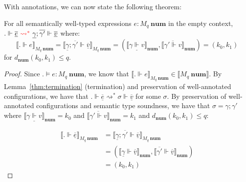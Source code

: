 With annotations, we can now state the following theorem:
\begin{theorem}\label{thm:error-soundness}
  For all semantically well-typed expressions $e : M_q \ \mathbf{num}$ in the
  empty context, $. \Vdash \underline{\overline{e}} \
  \textcolor{red}{\rightsquigarrow^*} \ \underline{\gamma}; \overline{\gamma'}
  \Vdash \underline{\overline{v}}$ where:
  $$
  \llbracket . \Vdash e \rrbracket_{M_q \ \mathbf{num}} 
  = \llbracket \underline{\gamma}; \overline{\gamma'} \Vdash
  \underline{\overline{v}} \rrbracket_{M_q \ \mathbf{num}} 
  = (\llbracket \underline{\gamma \Vdash v} \rrbracket_{\mathbf{num}},
  \llbracket \overline{\gamma' \Vdash v} \rrbracket_{\mathbf{num}}) 
  = (k_0, k_1)
  $$
  for $d_{\mathbf{num}}(k_0, k_1) \leq q$.
\end{theorem}
\begin{proof}
  Since $. \vDash e : M_q \ \mathbf{num}$, we know that $\llbracket . \Vdash e
  \rrbracket_{M_q \ \mathbf{num}} \in \llbracket M_q \ \mathbf{num}
  \rrbracket$. 
  By Lemma~\ref{thm:termination} (termination) and preservation of
  well-annotated configurations, we have that 
  $. \Vdash \underline{\overline{e}} \rightsquigarrow^{*} \sigma \Vdash
  \underline{\overline{v}}$ for some $\sigma$.
  By preservation of well-annotated configurations and semantic type soundness, we have
  that $\sigma = \gamma; \gamma'$ where $\llbracket \underline{\gamma \Vdash v}
  \rrbracket_{\mathbf{num}} = k_0$ and $\llbracket \overline{\gamma' \Vdash v}
  \rrbracket_{\mathbf{num}} = k_1$ and $d_{\mathbf{num}}(k_0, k_1) \leq q$:

  \begin{equation}
    \begin{aligned}
      \llbracket . \Vdash \underline{\overline{e}} \rrbracket_{M_q \ \mathbf{num}} 
        &=
      \llbracket \underline{\gamma}; \overline{\gamma'} \Vdash \underline{\overline{v}} \rrbracket_{M_q \ \mathbf{num}} \\
      &=
      (\llbracket \underline{\gamma} \Vdash \underline{\overline{v}} \rrbracket_{\mathbf{num}}, \llbracket \overline{\gamma'} \Vdash \underline{\overline{v}} \rrbracket_{\mathbf{num}}) \\
      &= 
      (k_0, k_1)
    \end{aligned}
  \end{equation}
\end{proof}


